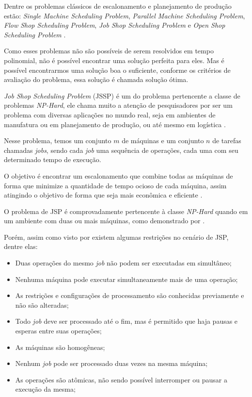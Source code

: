     Dentre os problemas clássicos de escalonamento e planejamento de produção estão: 
    \textit{Single Machine Scheduling Problem}, 
    \textit{Parallel Machine Scheduling Problem}, 
    \textit{Flow Shop Scheduling Problem}, 
    \textit{Job Shop Scheduling Problem} e 
    \textit{Open Shop Scheduling Problem} 
    \cite{Allahverdi2008}.\newline

    Como esses problemas não são possíveis de serem resolvidos em tempo polinomial, não é possível encontrar uma solução perfeita para eles. Mas é possível encontrarmos uma solução boa o suficiente, conforme os critérios de avaliação do problema, essa solução é chamada solução ótima.\newline

    \textit{Job Shop Scheduling Problem} (JSSP) é um do problema pertencente a classe de problemas \textit{NP-Hard}, ele chama muito a atenção de pesquisadores por ser um problema com diversas aplicações no mundo real, seja em ambientes de manufatura ou em planejamento de produção, ou até mesmo em logística \cite{Cheng1996}.\newline

    Nesse problema, temos um conjunto $m$ de máquinas e um conjunto $n$ de tarefas chamadas \textit{jobs}, sendo cada \textit{job} uma sequência de operações, cada uma com seu determinado tempo de execução. \newline 

    O objetivo é encontrar um escalonamento que combine todas as máquinas de forma que minimize a quantidade de tempo ocioso de cada máquina, assim atingindo o objetivo de forma que seja mais econômica e eficiente \cite{Cheng1996}. \newline

    O problema de JSP é comprovadamente pertencente à classe \textit{NP-Hard} quando em um ambiente com duas ou mais máquinas, como demonstrado por \cite{Lenstra1979}. \newline

    Porém, assim como visto por \cite{Bagchi1999} existem algumas restrições no cenário de JSP, dentre elas:
    \begin{itemize}
        \item Duas operações do mesmo \textit{job} não podem ser executadas em simultâneo;
        \item Nenhuma máquina pode executar simultaneamente mais de uma operação;
        \item As restrições e configurações de processamento são conhecidas previamente e não são alteradas;
        \item Todo \textit{job} deve ser processado até o fim, mas é permitido que haja pausas e esperas entre suas operações;
        \item As máquinas são homogêneas;
        \item Nenhum \textit{job} pode ser processado duas vezes na mesma máquina;
        \item As operações são atômicas, não sendo possível interromper ou pausar a execução da mesma;
    \end{itemize}

